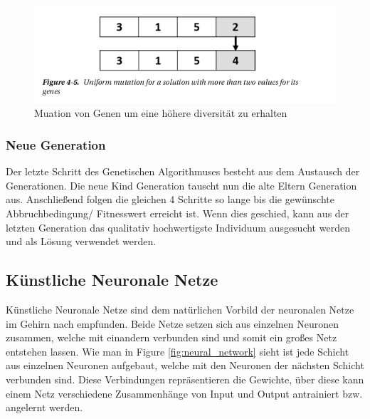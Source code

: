 \begin{figure}[H]
  \centering  
  \includegraphics[scale=0.7]{img/mutation.png}
  \caption{Muation von Genen um eine höhere diversität zu erhalten}
  \label{fig:chromoson_mutation}
\end{figure}


\subsubsection{Neue Generation}
Der letzte Schritt des Genetischen Algorithmuses besteht aus dem Austausch der Generationen. Die neue Kind Generation tauscht nun die alte Eltern Generation aus. Anschließend folgen die gleichen 4 Schritte so lange bis die gewünschte Abbruchbedingung/ Fitnesswert erreicht ist. Wenn dies geschied, kann aus der letzten Generation das qualitativ hochwertigste Individuum ausgesucht werden und als Lösung verwendet werden.

\newpage

\subsection{Künstliche Neuronale Netze}

Künstliche Neuronale Netze sind dem natürlichen Vorbild der neuronalen Netze im Gehirn nach empfunden. Beide Netze setzen sich aus einzelnen Neuronen zusammen, welche mit einandern verbunden sind und somit ein großes Netz entstehen lassen. Wie man in Figure \ref{fig:neural_network} sieht ist jede Schicht aus einzelnen Neuronen aufgebaut, welche mit den Neuronen der nächsten Schicht verbunden sind. Diese Verbindungen repräsentieren die Gewichte, über diese kann einem Netz verschiedene Zusammenhänge von Input und Output antrainiert bzw. angelernt werden.

